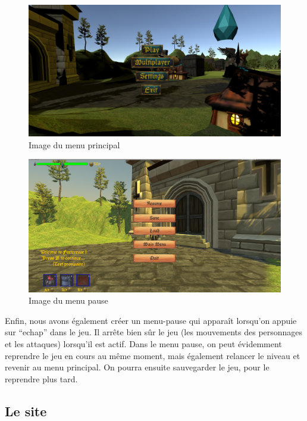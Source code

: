 \documentclass[a4paper, 12pt]{article}
\begin{document}
\newpage
	\begin{figure}[!ht]
		\centerline{\includegraphics[scale=0.3]{mainMenu.png}}
		\caption*{Image du menu principal}		
	\end{figure}
	\begin{figure}[!ht]
		\centerline{\includegraphics[scale=0.3]{pauseMenu.png}}
		\caption*{Image du menu pause}
	\end{figure}
	
	\par Enfin, nous avons également créer un menu-pause qui apparaît lorsqu’on appuie sur “echap” dans le jeu. Il arrête bien sûr le jeu (les mouvements des personnages et les attaques) lorsqu’il est actif. Dans le menu pause, on peut évidemment reprendre le jeu en cours au même moment, mais également relancer le niveau et revenir au menu principal. On pourra ensuite sauvegarder le jeu, pour le reprendre plus tard.

	\subsection{Le site}
	 
\end{document}
